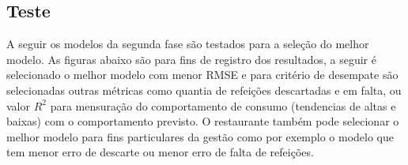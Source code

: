 	    \subsection{Teste}
	        A seguir os modelos da segunda fase são testados para a seleção do melhor modelo.
	        As figuras abaixo são para fins de registro dos resultados, a seguir é selecionado o melhor modelo com menor RMSE e para critério de desempate são selecionadas outras métricas como quantia de refeições descartadas e em falta, ou valor $R^2$ para mensuração do comportamento de consumo (tendencias de altas e baixas) com o comportamento previsto. O restaurante também pode selecionar o melhor modelo para fins particulares da gestão como por exemplo o modelo que tem menor erro de descarte ou menor erro de falta de refeições. 
    	    
